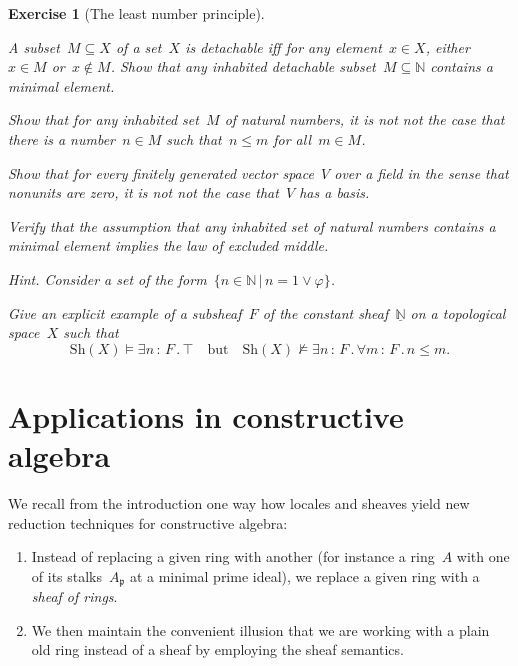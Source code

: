 \documentclass{ws-rv9x6}
\newtheorem{ex}{Exercise}
\newenvironment{exercise}[1]{
  \begin{ex}[#1]
}{\end{ex}}
\newcommand{\NN}{\mathbb{N}}
\newcommand{\ppp}{\mathfrak{p}}
\newcommand{\Sh}{\mathrm{Sh}}
\renewcommand{\_}{\mathpunct{.}}
\newcommand{\?}{\,{:}\,}
\newcommand{\notnot}{\emph{not not}\xspace}
\begin{document}
\begin{exercise}{The least number principle}%
\label{ex:least-number-principle}%
\begin{alphlist}[(e)]
\item A subset~$M \subseteq X$ of a set~$X$ is \emph{detachable} iff for any
element~$x \in X$, either~$x \in M$ or~$x \not\in M$. Show that any inhabited
detachable subset~$M \subseteq \NN$ contains a minimal element.
\item Show that for any inhabited set~$M$ of natural numbers, it is \notnot the
case that there is a number~$n \in M$ such that~$n \leq m$ for all~$m \in M$.
\item Show that for every finitely generated vector space~$V$ over a field in the
sense that nonunits are zero, it is \notnot the case that~$V$ has a basis.
\item Verify that the assumption that any inhabited set of natural numbers
contains a minimal element implies the law of excluded middle.\smallskip

{\scriptsize\emph{Hint.} Consider a set of the form~$\{ n \in \NN \,|\, n = 1
\vee \varphi \}$.\par}
\item Give an explicit example of a subsheaf~$F$ of the constant
sheaf~$\underline{\NN}$ on a topological space~$X$ such that
\[ \Sh(X) \models \exists n\?F\_ \top
  \quad\text{but}\quad
  \Sh(X) \not\models \exists n\?F\_ \forall m\?F\_ n \leq m. \]
\end{alphlist}
\end{exercise}



\section{Applications in constructive algebra}
\label{sect:appl}

We recall from the introduction one way how locales and sheaves yield new
reduction techniques for constructive algebra:
\begin{enumerate}
\item Instead of replacing a given ring with another (for instance a ring~$A$ with
one of its stalks~$A_\ppp$ at a minimal prime ideal), we replace a given ring
with a \emph{sheaf of rings}.
\item We then maintain the convenient illusion that we are working with a plain old ring
instead of a sheaf by employing the sheaf semantics.
\end{enumerate}
\end{document}
